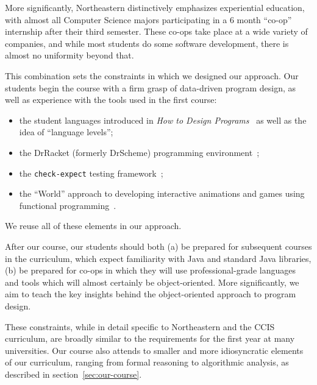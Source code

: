 \documentclass[submission,copyright]{eptcs}
\begin{document}
More significantly, Northeastern distinctively emphasizes experiential
education, with almost all Computer Science majors participating in a
6 month ``co-op'' internship after their third semester.  These co-ops
take place at a wide variety of companies, and while most students do
some software development, there is almost no uniformity beyond that. 

This combination sets the constraints in which we designed our
approach.  Our students begin the course with a firm grasp of
data-driven program design, as well as experience with the tools used
in the first course:

\begin{itemize}
  \item the student languages introduced in \emph{How to Design
    Programs}~\cite{dvanhorn:Felleisen2004Structure,
    dvanhorn:Felleisen2001How} as well as the idea of ``language levels'';

  \item the DrRacket (formerly DrScheme) 
    programming environment~\cite{dvanhorn:Findler2002DrScheme};

  \item the \texttt{check-expect} testing framework~\cite{local:check-expect};

  \item the ``World'' approach to developing interactive animations
    and games using functional
    programming~\cite{dvanhorn:Felleisen2009Functional}.
\end{itemize}

\noindent
We reuse all of these elements in our approach.

After our course, our students should both (a) be prepared for
subsequent courses in the curriculum, which expect familiarity with
Java and standard Java libraries, (b) be prepared for co-ops in which
they will use professional-grade languages and tools which will
almost certainly be object-oriented.  More significantly, we aim to
teach the key insights behind the object-oriented approach to program
design.

These constraints, while in detail specific to Northeastern and the
CCIS curriculum, are broadly similar to the requirements for the first
year at many universities.  Our course also attends to smaller and
more idiosyncratic elements of our curriculum, ranging from formal
reasoning to algorithmic analysis, as described in
section~\ref{sec:our-course}.
\end{document}
